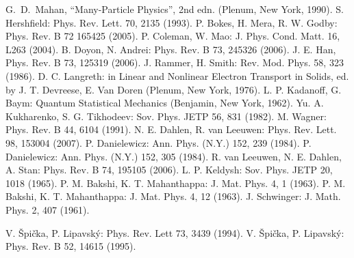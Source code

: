 \documentclass[a4paper,10pt]{jsarticle}
\begin{document}
%

\begin{thebibliography}{99}
 G.~D.~Mahan, ``Many-Particle Physics'', 2nd edn. (Plenum, New York, 1990).
 S. Hershfield: Phys. Rev. Lett. 70, 2135 (1993).
 P. Bokes, H. Mera, R. W. Godby: Phys. Rev. B 72 165425 (2005).
 P. Coleman, W. Mao: J. Phys. Cond. Matt. 16, L263 (2004).
 B. Doyon, N. Andrei: Phys. Rev. B 73, 245326 (2006).
 J. E. Han, Phys. Rev. B 73, 125319 (2006).
 J. Rammer, H. Smith: Rev. Mod. Phys. 58, 323 (1986).
 D. C. Langreth: in Linear and Nonlinear Electron Transport in Solids, ed. by J. T. Devreese, E. Van Doren (Plenum, New York, 1976).
 L. P. Kadanoff, G. Baym: Quantum Statistical Mechanics (Benjamin, New York, 1962).
 Yu. A. Kukharenko, S. G. Tikhodeev: Sov. Phys. JETP 56, 831 (1982).
 M. Wagner: Phys. Rev. B 44, 6104 (1991).
 N. E. Dahlen, R. van Leeuwen: Phys. Rev. Lett. 98, 153004 (2007).
 P. Danielewicz: Ann. Phys. (N.Y.) 152, 239 (1984).
 P. Danielewicz: Ann. Phys. (N.Y.) 152, 305 (1984).
 R. van Leeuwen, N. E. Dahlen, A. Stan: Phys. Rev. B 74, 195105 (2006).
 L. P. Keldysh: Sov. Phys. JETP 20, 1018 (1965).
 P. M. Bakshi, K. T. Mahanthappa: J. Mat. Phys. 4, 1 (1963).
 P. M. Bakshi, K. T. Mahanthappa: J. Mat. Phys. 4, 12 (1963).
 J. Schwinger: J. Math. Phys. 2, 407 (1961).

 V. \v{S}pi\v{c}ka, P. Lipavsk\'{y}: Phys. Rev. Lett 73, 3439 (1994).
 V. \v{S}pi\v{c}ka, P. Lipavsk\'{y}: Phys. Rev. B 52, 14615 (1995).

\end{thebibliography}
\end{document}

